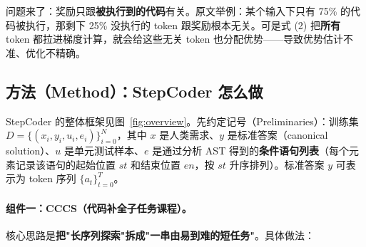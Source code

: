 \documentclass[11pt,UTF8,fontset=fandol]{ctexart}
\begin{document}
问题来了：奖励只跟\textbf{被执行到的代码}有关。原文举例：某个输入下只有 75\% 的代码被执行，那剩下 25\% 没执行的 token 跟奖励根本无关。可是式 (2) 把\textbf{所有} token 都拉进梯度计算，就会给这些无关 token 也分配优势——导致优势估计不准、优化不精确。

\subsection{方法（Method）：StepCoder 怎么做}

StepCoder 的整体框架见图~\ref{fig:overview}。先约定记号（Preliminaries）：训练集 $D = \{(x_i, y_i, u_i, e_i)\}_{i=0}^{N}$，其中 $x$ 是人类需求、$y$ 是标准答案（canonical solution）、$u$ 是单元测试样本、$e$ 是通过分析 AST 得到的\textbf{条件语句列表}（每个元素记录该语句的起始位置 $st$ 和结束位置 $en$，按 $st$ 升序排列）。标准答案 $y$ 可表示为 token 序列 $\{a_t\}_{t=0}^{T}$。

\paragraph{组件一：CCCS（代码补全子任务课程）。} 核心思路是\textbf{把"长序列探索"拆成"一串由易到难的短任务"}。具体做法：
\end{document}
